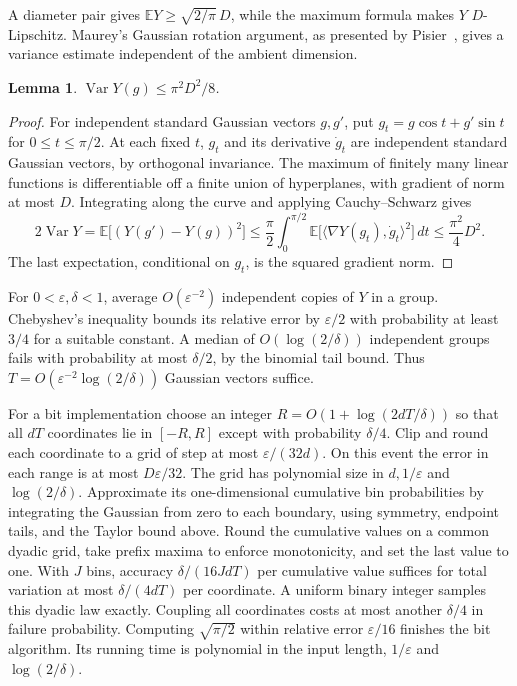 \documentclass[11pt,letterpaper]{article}
\newtheorem{lemma}[theorem]{Lemma}
\theoremstyle{definition}
\newcommand{\E}{\mathbb E}
\newcommand{\ip}[2]{\langle #1,#2\rangle}
\DeclareMathOperator{\Var}{Var}
\begin{document}
A diameter pair gives
\(\E Y\ge\sqrt{2/\pi}\,D\), while the maximum formula makes \(Y\)
\(D\)-Lipschitz. Maurey's Gaussian rotation argument, as presented by Pisier~\cite[Theorem~2.2]{pisier-gaussian}, gives a variance estimate independent of the ambient dimension.

\begin{lemma}
\(\Var Y(g)\le\pi^2D^2/8\).
\end{lemma}
\begin{proof}
For independent standard Gaussian vectors \(g,g'\), put
\(g_t=g\cos t+g'\sin t\) for \(0\le t\le\pi/2\).
At each fixed \(t\), \(g_t\) and its derivative \(\dot g_t\) are
independent standard Gaussian vectors, by orthogonal invariance.
The maximum of finitely many linear functions is differentiable off
a finite union of hyperplanes, with gradient of norm at most \(D\).
Integrating along the curve and applying Cauchy--Schwarz gives
\[
 2\Var Y=\E\big[(Y(g')-Y(g))^2\big]
 \le\frac{\pi}{2}\int_0^{\pi/2}
       \E\big[\ip{\nabla Y(g_t)}{\dot g_t}^2\big]\,dt
 \le\frac{\pi^2}{4}D^2 .
\]
The last expectation, conditional on \(g_t\), is the squared gradient norm.
\end{proof}

For \(0<\varepsilon,\delta<1\), average \(O(\varepsilon^{-2})\)
independent copies of \(Y\) in a group. Chebyshev's inequality bounds its
relative error by \(\varepsilon/2\) with probability at least \(3/4\)
for a suitable constant. A median of \(O(\log(2/\delta))\) independent
groups fails with probability at most \(\delta/2\), by the binomial tail
bound. Thus \(T=O(\varepsilon^{-2}\log(2/\delta))\) Gaussian vectors suffice.

For a bit implementation choose an integer \(R=O(1+\log(2dT/\delta))\)
so that all \(dT\) coordinates lie in \([-R,R]\) except with probability
\(\delta/4\). Clip and round each coordinate to a grid of step at most
\(\varepsilon/(32d)\). On this event the error in each range is at most
\(D\varepsilon/32\). The grid has polynomial size in \(d,1/\varepsilon\)
and \(\log(2/\delta)\). Approximate its one-dimensional cumulative bin
probabilities by integrating the Gaussian from zero to each boundary,
using symmetry, endpoint tails, and the Taylor bound above. Round the
cumulative values on a common dyadic grid, take prefix maxima to enforce
monotonicity, and set the last value to one. With \(J\) bins, accuracy
\(\delta/(16JdT)\) per cumulative value suffices for total variation at
most \(\delta/(4dT)\) per coordinate. A uniform binary integer samples
this dyadic law exactly. Coupling all coordinates costs at most another
\(\delta/4\) in failure probability. Computing \(\sqrt{\pi/2}\) within
relative error \(\varepsilon/16\) finishes the bit algorithm. Its running
time is polynomial in the input length, \(1/\varepsilon\) and
\(\log(2/\delta)\).
\end{document}

